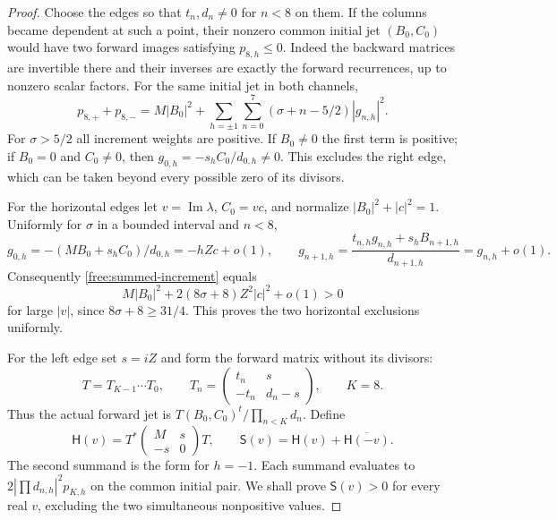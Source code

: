 \begin{proof}
Choose the edges so that $t_n,d_n\ne0$ for $n<8$ on them.  If the
columns became dependent at such a point, their nonzero common initial
jet $(B_0,C_0)$ would have two forward images satisfying $p_{8,h}\le0$.
Indeed the backward matrices are invertible there and their inverses
are exactly the forward recurrences, up to nonzero scalar factors.
For the same initial jet in both channels,
\begin{equation}\label{free:summed-increment}
 p_{8,+}+p_{8,-}=M|B_0|^2+
 \sum_{h=\pm1}\sum_{n=0}^7
 (\sigma+n-5/2)|g_{n,h}|^2.
\end{equation}
For $\sigma>5/2$ all increment weights are positive.  If $B_0\ne0$
the first term is positive; if $B_0=0$ and $C_0\ne0$, then
$g_{0,h}=-s_hC_0/d_{0,h}\ne0$.  This excludes the right edge,
which can be taken beyond every possible zero of its divisors.

For the horizontal edges let $v=\operatorname{Im}\lambda$,
$C_0=vc$, and normalize $|B_0|^2+|c|^2=1$.
Uniformly for $\sigma$ in a bounded interval and $n<8$,
\[
 g_{0,h}=-(MB_0+s_hC_0)/d_{0,h}=-hZc+o(1),\qquad
 g_{n+1,h}=\frac{t_{n,h}g_{n,h}+s_hB_{n+1,h}}{d_{n+1,h}}
             =g_{n,h}+o(1).
\]
Consequently \eqref{free:summed-increment} equals
\[
 M|B_0|^2+2(8\sigma+8)Z^2|c|^2+o(1)>0
\]
for large $|v|$, since $8\sigma+8\ge31/4$.
This proves the two horizontal exclusions uniformly.

For the left edge set $s=iZ$ and form the forward matrix without its
divisors:
\begin{equation}\label{free:forward-matrix}
 T=T_{K-1}\cdots T_0,\qquad
 T_n=\begin{pmatrix}t_n&s\\-t_n&d_n-s\end{pmatrix},\qquad K=8.
\end{equation}
Thus the actual forward jet is $T(B_0,C_0)^t/\prod_{n<K}d_n$.
Define
\begin{equation}\label{free:boundary-form}
 \mathsf H(v)=T^*
 \begin{pmatrix}M&s\\-s&0\end{pmatrix}T,
 \qquad \mathsf S(v)=\mathsf H(v)+\overline{\mathsf H(-v)}.
\end{equation}
The second summand is the form for $h=-1$.  Each summand evaluates to
$2|\prod d_{n,h}|^2p_{K,h}$ on the common initial pair.  We shall prove
$\mathsf S(v)>0$ for every real $v$, excluding the two simultaneous
nonpositive values.


\end{proof}
